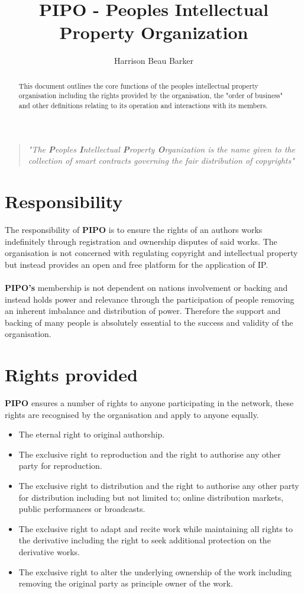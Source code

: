 \documentclass[12pt,draft]{article}
\begin{document}
\title{PIPO - Peoples Intellectual Property Organization}
\author{Harrison Beau Barker}
\date{}
\maketitle
\begin{quote}
\emph{"The \textbf{P}eoples \textbf{I}ntellectual \textbf{P}roperty \textbf{O}rganization is the name given to the collection of smart contracts governing the fair distribution of copyrights"}
\end{quote}

\begin{abstract}
This document outlines the core functions of the peoples intellectual property organisation including the rights provided by the organisation, the "order of business" and other definitions relating to its operation and interactions with its members.
\end{abstract}

\tableofcontents

\section{Responsibility}
The responsibility of \textbf{PIPO} is to ensure the rights of an authors works indefinitely through registration and ownership disputes of said works. The organisation is not concerned with regulating copyright and intellectual property but instead provides an open and free platform for the application of IP.
\\
\\
\textbf{PIPO's} membership is not dependent on nations involvement or backing and instead holds power and relevance through the participation of people removing an inherent imbalance and distribution of power. Therefore the support and backing of many people is absolutely essential to the success and validity of the organisation.

\section{Rights provided}
\textbf{PIPO} ensures a number of rights to anyone participating in the network, these rights are recognised by the organisation and apply to anyone equally.
\begin{itemize}
	\item The eternal right to original authorship.
	\item The exclusive right to reproduction and the right to authorise any other party for reproduction.
	\item The exclusive right to distribution and the right to authorise any other party for distribution including but not limited to; online distribution markets, public performances or broadcasts.
	\item The exclusive right to adapt and recite work while maintaining all rights to the derivative including the right to seek additional protection on the derivative works.
	\item The exclusive right to alter the underlying ownership of the work including removing the original party as principle owner of the work.
\end{itemize}
\end{document}
